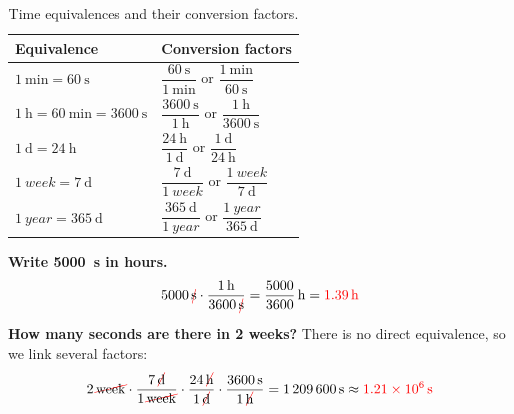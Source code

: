 \begin{table}[H]
    \centering
    \renewcommand{\arraystretch}{2.4}
    \begin{tabular}{ll}
        \toprule
        \textbf{Equivalence} & \textbf{Conversion factors} \\
        \midrule
        \(\qty{1}{\minute} = \qty{60}{\s}\) & \(\dfrac{\qty{60}{\s}}{\qty{1}{\minute}}\) or \(\dfrac{\qty{1}{\minute}}{\qty{60}{\s}}\) \\
        \(\qty{1}{\hour} = \qty{60}{\minute} = \qty{3600}{\s}\) & \(\dfrac{\qty{3600}{\s}}{\qty{1}{\hour}}\) or \(\dfrac{\qty{1}{\hour}}{\qty{3600}{\s}}\) \\
        \(\qty{1}{\day} = \qty{24}{\hour}\) & \(\dfrac{\qty{24}{\hour}}{\qty{1}{\day}}\) or \(\dfrac{\qty{1}{\day}}{\qty{24}{\hour}}\) \\
        \(\qty{1}{week} = \qty{7}{\day}\) & \(\dfrac{\qty{7}{\day}}{\qty{1}{week}}\) or \(\dfrac{\qty{1}{week}}{\qty{7}{\day}}\) \\
        \(\qty{1}{year} = \qty{365}{\day}\) & \(\dfrac{\qty{365}{\day}}{\qty{1}{year}}\) or \(\dfrac{\qty{1}{year}}{\qty{365}{\day}}\) \\
        \bottomrule
    \end{tabular}
    \caption{Time equivalences and their conversion factors.}
    \label{tab:u1_time}
\end{table}

\begin{example}
    \textbf{Write \qty{5000}{\s} in hours.}
    \begin{equation*}
        \num{5000}\,\cancelunit{\s} \cdot \dfrac{\qty{1}{\hour}}{\num{3600}\,\cancelunit{\s}} = \dfrac{5000}{3600}\,\unit{\hour} = \textcolor{red}{\qty{1.39}{\hour}}
    \end{equation*}
\end{example}

\begin{example}
    \textbf{How many seconds are there in 2 weeks?} There is no direct equivalence, so we link several factors:
    \begin{equation*}
        \num{2}\,\cancelunit{week} \cdot \dfrac{\num{7}\,\cancelunit{\day}}{1\,\cancelunit{week}} \cdot \dfrac{\num{24}\,\cancelunit{\hour}}{1\,\cancelunit{\day}} \cdot \dfrac{\qty{3600}{\s}}{1\,\cancelunit{\hour}} = \qty{1209600}{\s} \approx \textcolor{red}{\qty{1.21e6}{\s}}
    \end{equation*}
\end{example}

